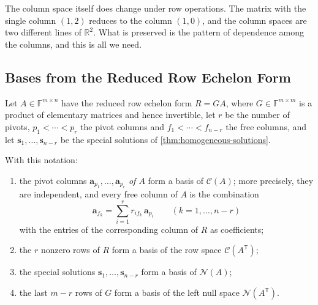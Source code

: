 The column space itself does change under row operations. The matrix with the single column $(1,2)$ reduces to the column $(1,0)$, and the column spaces are two different lines of $\mathbb R^2$. What is preserved is the pattern of dependence among the columns, and this is all we need.

\subsection{Bases from the Reduced Row Echelon Form}

Let $A\in\mathbb F^{m\times n}$ have the reduced row echelon form $R=GA$, where $G\in\mathbb F^{m\times m}$ is a product of elementary matrices and hence invertible, let $r$ be the number of pivots, $p_1<\cdots<p_r$ the pivot columns and $f_1<\cdots<f_{n-r}$ the free columns, and let $\mathbf s_1,\ldots,\mathbf s_{n-r}$ be the special solutions of \cref{thm:homogeneous-solutions}.

\begin{theorem}
\label{thm:four-bases}
With this notation:
\begin{enumerate}
\item the pivot columns $\mathbf a_{p_1},\ldots,\mathbf a_{p_r}$ \emph{of $A$} form a basis of $\mathcal C(A)$; more precisely, they are independent, and every free column of $A$ is the combination
\[
\mathbf a_{f_k}=\sum_{i=1}^rr_{if_k}\,\mathbf a_{p_i}\qquad(k=1,\ldots,n-r)
\]
with the entries of the corresponding column of $R$ as coefficients;
\item the $r$ nonzero rows of $R$ form a basis of the row space $\mathcal C(A^{\mathsf T})$;
\item the special solutions $\mathbf s_1,\ldots,\mathbf s_{n-r}$ form a basis of $\mathcal N(A)$;
\item the last $m-r$ rows of $G$ form a basis of the left null space $\mathcal N(A^{\mathsf T})$.
\end{enumerate}
\end{theorem}

